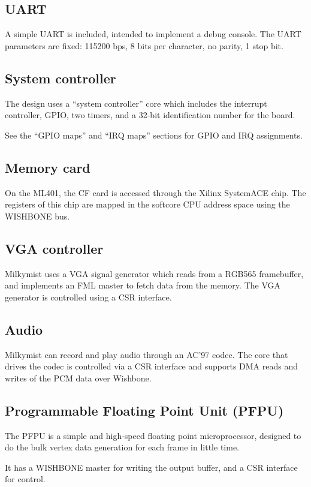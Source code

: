 \documentclass[a4paper,11pt]{article}
\begin{document}
\subsection{UART}
A simple UART is included, intended to implement a debug console. The UART parameters are fixed: 115200 bps, 8 bits per character, no parity, 1 stop bit.

\subsection{System controller}
The design uses a ``system controller'' core which includes the interrupt controller, GPIO, two timers, and a 32-bit identification number for the board.

See the ``GPIO maps'' and ``IRQ maps'' sections for GPIO and IRQ assignments.

\subsection{Memory card}
On the ML401, the CF card is accessed through the Xilinx SystemACE chip. The registers of this chip are mapped in the softcore CPU address space using the WISHBONE bus.

\subsection{VGA controller}
Milkymist uses a VGA signal generator which reads from a RGB565 framebuffer, and implements an FML master to fetch data from the memory. The VGA generator is controlled using a CSR interface.

\subsection{Audio}
Milkymist can record and play audio through an AC'97 codec. The core that drives the codec is controlled via a CSR interface and supports DMA reads and writes of the PCM data over Wishbone.

\subsection{Programmable Floating Point Unit (PFPU)}
The PFPU is a simple and high-speed floating point microprocessor, designed to do the bulk vertex data generation for each frame in little time.

It has a WISHBONE master for writing the output buffer, and a CSR interface for control.
\end{document}
